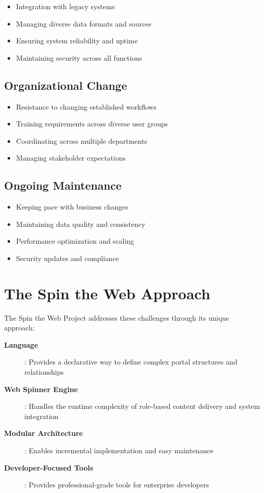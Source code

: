 \begin{itemize}
    \item Integration with legacy systems
    \item Managing diverse data formats and sources
    \item Ensuring system reliability and uptime
    \item Maintaining security across all functions
\end{itemize}

\subsection{Organizational Change}

\begin{itemize}
    \item Resistance to changing established workflows
    \item Training requirements across diverse user groups
    \item Coordinating across multiple departments
    \item Managing stakeholder expectations
\end{itemize}

\subsection{Ongoing Maintenance}

\begin{itemize}
    \item Keeping pace with business changes
    \item Maintaining data quality and consistency
    \item Performance optimization and scaling
    \item Security updates and compliance
\end{itemize}

\section{The Spin the Web Approach}
\label{sec:spin-approach}

The Spin the Web Project addresses these challenges through its unique approach:

\begin{description}
\item[\textbf{\wbdl{} Language}]: Provides a declarative way to define complex portal structures and relationships
\item[\textbf{Web Spinner Engine}]: Handles the runtime complexity of role-based content delivery and system integration
\item[\textbf{Modular Architecture}]: Enables incremental implementation and easy maintenance
\item[\textbf{Developer-Focused Tools}]: Provides professional-grade tools for enterprise developers
\end{description}

